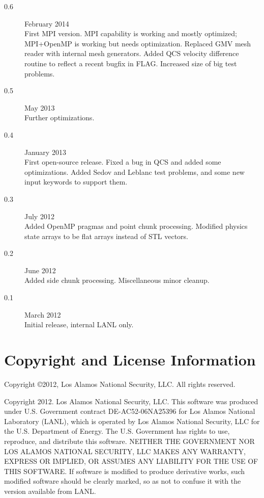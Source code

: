 \documentclass[11pt,letterpaper]{article}
\begin{document}
\begin{description}
\item[0.6] February 2014 \\
     First MPI version.  MPI capability is working and mostly
     optimized; MPI+OpenMP is working but needs optimization.
     Replaced GMV mesh reader with internal mesh generators.
     Added QCS velocity difference routine to reflect a recent
     bugfix in FLAG.  Increased size of big test problems.

\item[0.5] May 2013 \\
     Further optimizations.

\item[0.4] January 2013 \\
     First open-source release.  Fixed a bug in QCS and added some
     optimizations.  Added Sedov and Leblanc test problems, and some
     new input keywords to support them.

\item[0.3] July 2012 \\
     Added OpenMP pragmas and point chunk processing.  Modified physics
     state arrays to be flat arrays instead of STL vectors.

\item[0.2] June 2012 \\
     Added side chunk processing.  Miscellaneous minor cleanup.

\item[0.1] March 2012 \\
     Initial release, internal LANL only.
\end{description}

\section{Copyright and License Information}

Copyright \copyright 2012, Los Alamos National Security, LLC.
All rights reserved.

Copyright 2012. Los Alamos National Security, LLC.
This software was produced under U.S. Government contract
DE-AC52-06NA25396 for Los Alamos National Laboratory (LANL), which is
operated by Los Alamos National Security, LLC for the U.S. Department
of Energy. The U.S. Government has rights to use, reproduce, and
distribute this software. NEITHER THE GOVERNMENT NOR LOS ALAMOS
NATIONAL SECURITY, LLC MAKES ANY WARRANTY, EXPRESS OR IMPLIED, OR
ASSUMES ANY LIABILITY FOR THE USE OF THIS SOFTWARE. If software is
modified to produce derivative works, such modified software should be
clearly marked, so as not to confuse it with the version available from
LANL.
\end{document}
